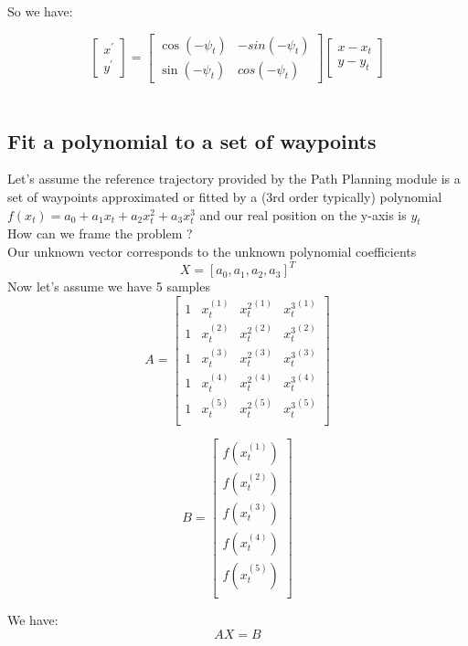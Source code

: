 \documentclass[11pt]{article}
\begin{document}
So we have:

$$ \begin{bmatrix}
x^{'} \\ 
y^{'}
\end{bmatrix} = \begin{bmatrix}
\cos(-\psi_t) & -sin(-\psi_t) \\ 
\sin(-\psi_t) & cos(-\psi_t)
\end{bmatrix} \begin{bmatrix}
x - x_t \\ 
y - y_t
\end{bmatrix} $$ \\

\subsection{Fit a polynomial to a set of waypoints}

Let's assume the reference trajectory provided by the Path Planning module is a set of waypoints approximated or fitted by a (3rd order typically) polynomial $f(x_t)= a_0 + a_1 x_t + a_2 x_t^2 + a_3 x_t^3$ and our real position on the y-axis is $y_t$ \\

How can we frame the problem ? \\
Our unknown vector corresponds to the unknown polynomial coefficients
$$X=[a_0, a_1, a_2, a_3]^T$$
Now let's assume we have 5 samples
$$A=
\begin{bmatrix}
1 & x_t^{(1)} &  {x_t^2}^{(1)} &  {x_t^3}^{(1)} \\ 
1 & x_t^{(2)} &  {x_t^2}^{(2)} &  {x_t^3}^{(2)} \\
1 & x_t^{(3)} &  {x_t^2}^{(3)} &  {x_t^3}^{(3)} \\
1 & x_t^{(4)} &  {x_t^2}^{(4)} &  {x_t^3}^{(4)} \\
1 & x_t^{(5)} &  {x_t^2}^{(5)} &  {x_t^3}^{(5)} \\
\end{bmatrix}$$

$$B=
\begin{bmatrix}
f(x_t^{(1)}) \\ 
f(x_t^{(2)}) \\
f(x_t^{(3)}) \\
f(x_t^{(4)}) \\
f(x_t^{(5)}) \\
\end{bmatrix}$$

We have:
$$ AX=B $$
\end{document}
